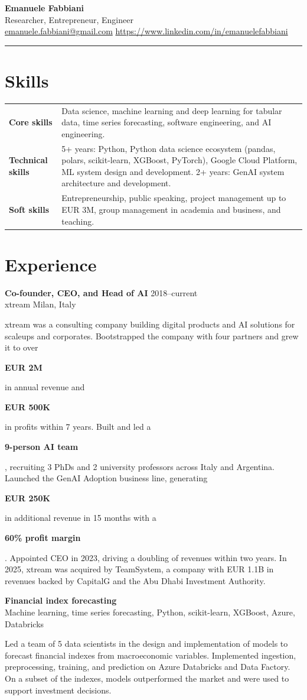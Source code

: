 \documentclass[10pt,a4paper]{article}
\newcommand{\role}[4]{%
  \textbf{#1} \hfill #2\\
  {\color{textgray}#3 \hfill #4}\par
}
\newcommand{\project}[2]{%
  \textbf{#1}\\[-1pt]
  {\color{textgray}#2}\par
}
\newcommand{\metric}[1]{\colorbox{softaccent}{\strut\textbf{#1}}}
\begin{document}
{\LARGE\bfseries Emanuele Fabbiani}\\[2pt]
{\large Researcher, Entrepreneur, Engineer}\\[5pt]
\href{mailto:emanuele.fabbiani@gmail.com}{emanuele.fabbiani@gmail.com} \quad
\href{https://www.linkedin.com/in/emanuelefabbiani}{https://www.linkedin.com/in/emanuelefabbiani}

\vspace{5pt}
{\color{accent}\rule{\textwidth}{2pt}}

\section*{Skills}
\begin{tabularx}{\textwidth}{>{\bfseries}p{2.8cm}X}
Core skills &
Data science, machine learning and deep learning for tabular data, time series forecasting, software engineering, and AI engineering.\\
Technical skills &
5+ years: Python, Python data science ecosystem (pandas, polars, scikit-learn, XGBoost, PyTorch), Google Cloud Platform, ML system design and development. 2+ years: GenAI system architecture and development.\\
Soft skills &
Entrepreneurship, public speaking, project management up to EUR 3M, group management in academia and business, and teaching.
\end{tabularx}

\section*{Experience}
\role{Co-founder, CEO, and Head of AI}{2018--current}{xtream}{Milan, Italy}
xtream was a consulting company building digital products and AI solutions for scaleups and corporates. Bootstrapped the company with four partners and grew it to over \metric{EUR 2M} in annual revenue and \metric{EUR 500K} in profits within 7 years. Built and led a \metric{9-person AI team}, recruiting 3 PhDs and 2 university professors across Italy and Argentina. Launched the GenAI Adoption business line, generating \metric{EUR 250K} in additional revenue in 15 months with a \metric{60\% profit margin}. Appointed CEO in 2023, driving a doubling of revenues within two years. In 2025, xtream was acquired by TeamSystem, a company with EUR 1.1B in revenues backed by CapitalG and the Abu Dhabi Investment Authority.

\vspace{3pt}
\project{Financial index forecasting}{Machine learning, time series forecasting, Python, scikit-learn, XGBoost, Azure, Databricks}
Led a team of 5 data scientists in the design and implementation of models to forecast financial indexes from macroeconomic variables. Implemented ingestion, preprocessing, training, and prediction on Azure Databricks and Data Factory. On a subset of the indexes, models outperformed the market and were used to support investment decisions.
\end{document}
